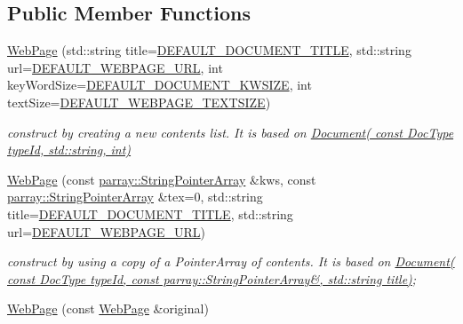 \subsection*{Public Member Functions}
\begin{DoxyCompactItemize}
\item 
\hypertarget{classdocs_1_1WebPage_a9642db10cbcecf7fd93338f936318e90}{\hyperlink{classdocs_1_1WebPage_a9642db10cbcecf7fd93338f936318e90}{Web\-Page} (std\-::string title=\hyperlink{namespacedocs_a4cf6dd6732c7e7ab7f7855e440485d89}{D\-E\-F\-A\-U\-L\-T\-\_\-\-D\-O\-C\-U\-M\-E\-N\-T\-\_\-\-T\-I\-T\-L\-E}, std\-::string url=\hyperlink{namespacedocs_a9bfb062436ca30729256c522cf54c111}{D\-E\-F\-A\-U\-L\-T\-\_\-\-W\-E\-B\-P\-A\-G\-E\-\_\-\-U\-R\-L}, int key\-Word\-Size=\hyperlink{namespacedocs_ae635b9481a61628036b5a97625856475}{D\-E\-F\-A\-U\-L\-T\-\_\-\-D\-O\-C\-U\-M\-E\-N\-T\-\_\-\-K\-W\-S\-I\-Z\-E}, int text\-Size=\hyperlink{namespacedocs_a966b8c0a825e3e04a2c667abefa97f41}{D\-E\-F\-A\-U\-L\-T\-\_\-\-W\-E\-B\-P\-A\-G\-E\-\_\-\-T\-E\-X\-T\-S\-I\-Z\-E})}\label{classdocs_1_1WebPage_a9642db10cbcecf7fd93338f936318e90}

\begin{DoxyCompactList}\small\item\em construct by creating a new contents list. It is based on \hyperlink{classdocs_1_1Document_a9f0b2c4c1a3e3344f374330399969e90}{Document( const Doc\-Type type\-Id, std\-::string, int)} \end{DoxyCompactList}\item 
\hypertarget{classdocs_1_1WebPage_a7013883a569946e65ba6522c878b0517}{\hyperlink{classdocs_1_1WebPage_a7013883a569946e65ba6522c878b0517}{Web\-Page} (const \hyperlink{classparray_1_1StringPointerArray}{parray\-::\-String\-Pointer\-Array} \&kws, const \hyperlink{classparray_1_1StringPointerArray}{parray\-::\-String\-Pointer\-Array} \&tex=0, std\-::string title=\hyperlink{namespacedocs_a4cf6dd6732c7e7ab7f7855e440485d89}{D\-E\-F\-A\-U\-L\-T\-\_\-\-D\-O\-C\-U\-M\-E\-N\-T\-\_\-\-T\-I\-T\-L\-E}, std\-::string url=\hyperlink{namespacedocs_a9bfb062436ca30729256c522cf54c111}{D\-E\-F\-A\-U\-L\-T\-\_\-\-W\-E\-B\-P\-A\-G\-E\-\_\-\-U\-R\-L})}\label{classdocs_1_1WebPage_a7013883a569946e65ba6522c878b0517}

\begin{DoxyCompactList}\small\item\em construct by using a copy of a Pointer\-Array of contents. It is based on \hyperlink{classdocs_1_1Document_a4a76d0cee2709582e4b9f3b5b8db0277}{Document( const Doc\-Type type\-Id, const parray\-::\-String\-Pointer\-Array\&, std\-::string title)}; \end{DoxyCompactList}\item 
\hypertarget{classdocs_1_1WebPage_a4c2ea40e27d1763d3f7c2c5055518a41}{\hyperlink{classdocs_1_1WebPage_a4c2ea40e27d1763d3f7c2c5055518a41}{Web\-Page} (const \hyperlink{classdocs_1_1WebPage}{Web\-Page} \&original)}\label{classdocs_1_1WebPage_a4c2ea40e27d1763d3f7c2c5055518a41}


\end{DoxyCompactItemize}
